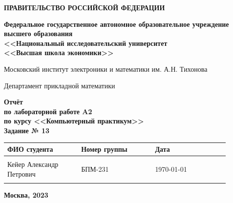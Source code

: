 \documentclass[12pt]{article}
\begin{document}
	
	\thispagestyle{empty}
	\begin{center}
		\textbf{ПРАВИТЕЛЬСТВО РОССИЙСКОЙ ФЕДЕРАЦИИ}
		
		\vspace{5ex}
		
		\textbf{Федеральное государственное автономное образовательное учреждение \\ высшего образования \\ <<Национальный исследовательский университет \\ <<Высшая школа экономики>>}
	\end{center}
	\vspace{5ex}
	
	\begin{center}
		Московский институт электроники и математики им. А.Н. Тихонова  
		
		\vspace{5ex}
		
		Департамент прикладной математики
		
		\vspace{10ex}
		\textbf{Отчёт \\ по лабораторной работе A2 \\ по курсу <<Компьютерный практикум>> \\ Задание № 13}
		\vspace{7ex}
		
	\end{center}
	
	\begin{center} 
		\begin{tabular}{| p{0.3\linewidth}| p{0.3\linewidth}| p{0.3\linewidth}|}
			\hline	
			ФИО студента & Номер группы & Дата \\  \hline
			& & \\  
			Кейер Александр \newline Петрович & БПМ-231 & \today \\  
			& & \\  \hline		
		\end{tabular}
	\end{center}
	
	\begin{center}
		\vspace{3ex}
		
		\vfill
		
		\normalsize
		
		\textbf{Москва, 2023}
	\end{center}
	
	\newpage
	
\end{document}
